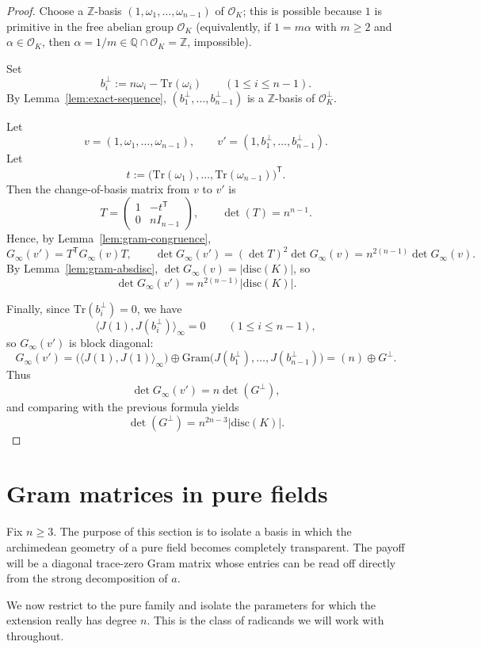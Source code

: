 \documentclass[11pt,letterpaper]{amsart}
\newcommand{\Q}{\mathbb{Q}}
\newcommand{\Z}{\mathbb{Z}}
\newcommand{\cO}{\mathcal{O}}
\newcommand{\Tr}{\mathrm{Tr}}
\newcommand{\disc}{\mathrm{disc}}
\theoremstyle{plain}
\theoremstyle{definition}
\begin{document}
\begin{proof}
Choose a \(\Z\)-basis \((1,\omega_1,\dots,\omega_{n-1})\) of \(\cO_K\); this is possible
because \(1\) is primitive in the free abelian group \(\cO_K\) (equivalently, if
\(1=m\alpha\) with \(m\ge 2\) and \(\alpha\in \cO_K\), then
\(\alpha=1/m\in \Q\cap \cO_K=\Z\), impossible).

Set
\[
b_i^\perp:=n\omega_i-\Tr(\omega_i)\qquad(1\le i\le n-1).
\]
By Lemma~\ref{lem:exact-sequence}, \((b_1^\perp,\dots,b_{n-1}^\perp)\) is a \(\Z\)-basis of
\(\cO_K^\perp\).

Let
\[
v=(1,\omega_1,\dots,\omega_{n-1}),\qquad
v'=(1,b_1^\perp,\dots,b_{n-1}^\perp).
\]
Let
\[
t:=\bigl(\Tr(\omega_1),\dots,\Tr(\omega_{n-1})\bigr)^{\mathsf T}.
\]
Then the change-of-basis matrix from \(v\) to \(v'\) is
\[
T=
\begin{pmatrix}
1 & -t^{\mathsf T}\\
0 & nI_{n-1}
\end{pmatrix},
\qquad
\det(T)=n^{n-1}.
\]
Hence, by Lemma~\ref{lem:gram-congruence},
\[
G_\infty(v')=T^{\mathsf T}G_\infty(v)T,
\qquad
\det G_\infty(v')=(\det T)^2\det G_\infty(v)=n^{2(n-1)}\det G_\infty(v).
\]
By Lemma~\ref{lem:gram-absdisc}, $\det G_\infty(v)=|\disc(K)|$, so
\[
\det G_\infty(v')=n^{2(n-1)}|\disc(K)|.
\]

Finally, since $\Tr(b_i^\perp)=0$, we have
\[
\langle J(1),J(b_i^\perp)\rangle_\infty=0\qquad(1\le i\le n-1),
\]
so $G_\infty(v')$ is block diagonal:
\[
G_\infty(v')=
\bigl(\langle J(1),J(1)\rangle_\infty\bigr)\oplus \mathrm{Gram}\bigl(J(b_1^\perp),\dots,J(b_{n-1}^\perp)\bigr)
=(n)\oplus G^\perp.
\]
Thus
\[
\det G_\infty(v')=n\det(G^\perp),
\]
and comparing with the previous formula yields
\[
\det(G^\perp)=n^{2n-3}|\disc(K)|.
\]
\end{proof}

\section{Gram matrices in pure fields}\label{sec:gram-pure-fields}

Fix $n\ge 3$. The purpose of this section is to isolate a basis in which the archimedean geometry of a pure field becomes completely transparent. The payoff will be a diagonal trace-zero Gram matrix whose entries can be read off directly from the strong decomposition of \(a\).


We now restrict to the pure family and isolate the parameters for which the extension really has degree \(n\). This is the class of radicands we will work with throughout.
\end{document}
